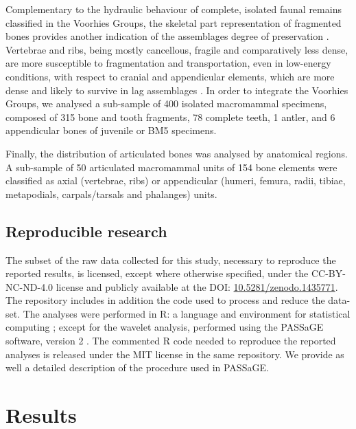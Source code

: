 \documentclass[review,times,authoryear]{elsarticle} %
\begin{document}
Complementary to the hydraulic behaviour of complete, isolated faunal remains classified in the Voorhies Groups, the skeletal part representation of fragmented bones provides another indication of the assemblages degree of preservation \citep{Dominguez-Rodrigo2014,Dominguez-Rodrigo2017,Pante2010}. Vertebrae and ribs, being mostly cancellous, fragile and comparatively less dense, are more susceptible to fragmentation and transportation, even in low-energy conditions, with respect to cranial and appendicular elements, which are more dense and likely to survive in lag assemblages \citep{Dominguez-Rodrigo2017}. In order to integrate the Voorhies Groups, we analysed a sub-sample of 400 isolated macromammal specimens, composed of 315 bone and tooth fragments, 78 complete teeth, 1 antler, and 6 appendicular bones of juvenile or BM5 specimens.

Finally, the distribution of articulated bones was analysed by anatomical regions. A sub-sample of 50 articulated macromammal units of 154 bone elements were classified as axial (vertebrae, ribs) or appendicular (humeri, femura, radii, tibiae, metapodials, carpals/tarsals and phalanges) units.

\subsection{Reproducible research}

The subset of the raw data collected for this study, necessary to reproduce the reported results, is licensed, except where otherwise specified, under the CC-BY-NC-ND-4.0 license and publicly available at the DOI: \href{https://doi.org/10.5281/zenodo.1435771}{10.5281/zenodo.1435771}. The repository includes in addition the code used to process and reduce the data-set.
The analyses were performed in \textsf{R}: a language and environment for statistical computing \citep{RCoreTeam2017}; except for the wavelet analysis, performed using the PASSaGE software, version 2 \citep{Rosenberg2011}. The commented \textsf{R} code needed to reproduce the reported analyses is released under the MIT license in the same repository. We provide as well a detailed description of the procedure used in PASSaGE.

\section{Results}
\end{document}
